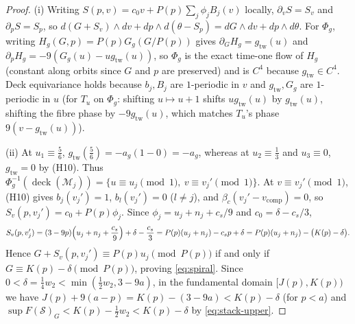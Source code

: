 \begin{proof}
(i) Writing $S(p,v)=c_0v+P(p)\sum_j\phi_jB_j(v)$ locally, $\partial_vS=S_v$ and $\partial_pS=S_p$, so
$d(G+S_v)\wedge dv+dp\wedge d(\theta-S_p)=dG\wedge dv+dp\wedge d\theta$. For $\Phi_g$, writing $H_g(G,p)=P(p)G_g(G/P(p))$
gives $\partial_GH_g=g_{\mathrm{tw}}(u)$ and $\partial_pH_g=-9(G_g(u)-ug_{\mathrm{tw}}(u))$, so $\Phi_g$ is the exact
time-one flow of $H_g$ (constant along orbits since $G$ and $p$ are preserved) and is $C^4$ because $g_{\mathrm{tw}}\in C^4$.
Deck equivariance holds because $b_j,B_j$ are $1$-periodic in $v$ and $g_{\mathrm{tw}},G_g$ are $1$-periodic in $u$
(for $T_u$ on $\Phi_g$: shifting $u\mapsto u+1$ shifts $u g_{\mathrm{tw}}(u)$ by $g_{\mathrm{tw}}(u)$, shifting the
fibre phase by $-9g_{\mathrm{tw}}(u)$, which matches $T_u$'s phase $9(v-g_{\mathrm{tw}}(u))$).

(ii) At $u_1\equiv\frac56$, $g_{\mathrm{tw}}(\frac56)=-a_g(1-0)=-a_g$, whereas at $u_2\equiv\frac13$ and $u_3\equiv0$,
$g_{\mathrm{tw}}=0$ by (H10). Thus $\Phi_g^{-1}(\operatorname{deck}(\mathcal M_j))=\{u\equiv u_j\pmod1,\ v\equiv v_j'\pmod1\}$.
At $v\equiv v_j'\pmod1$, (H10) gives $b_j(v_j')=1$, $b_l(v_j')=0$ ($l\ne j$), and $\beta_c(v_j'-v_{\mathrm{comp}})=0$,
so $S_v(p,v_j')=c_0+P(p)\phi_j$. Since $\phi_j=u_j+n_j+c_s/9$ and $c_0=\delta-c_s/3$,
\[
 S_v(p,v_j') = (3-9p)\Bigl(u_j+n_j+\frac{c_s}{9}\Bigr)+\delta-\frac{c_s}{3}
 = P(p)(u_j+n_j) - c_sp + \delta = P(p)(u_j+n_j) - \bigl(K(p)-\delta\bigr).
\]
Hence $G+S_v(p,v_j')\equiv P(p)u_j\pmod{P(p)}$ if and only if $G\equiv K(p)-\delta\pmod{P(p)}$, proving \eqref{eq:spiral}.
Since $0<\delta=\frac14w_2<\min(\frac12w_2,3-9a)$, in the fundamental domain $[J(p),K(p))$ we have
$J(p)+9(a-p)=K(p)-(3-9a)<K(p)-\delta$ (for $p<a$) and $\sup F(\mathcal S)_G<K(p)-\frac12w_2<K(p)-\delta$ by
\eqref{eq:stack-upper}.
\end{proof}
